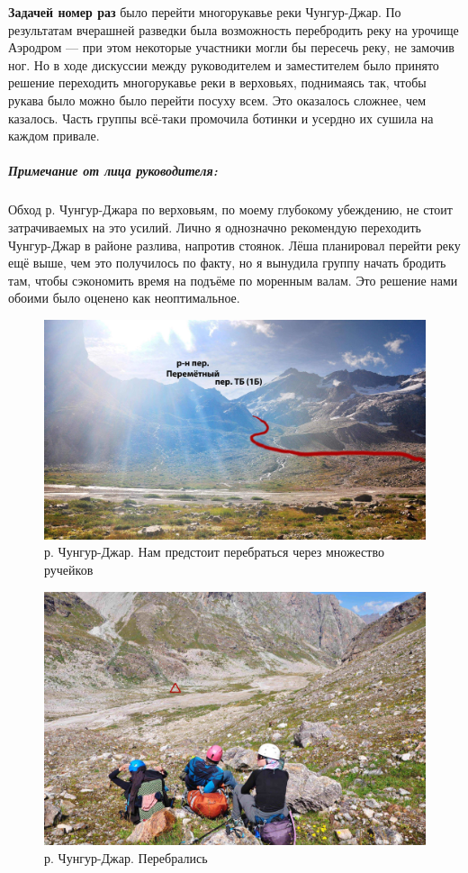 \textbf{Задачей номер раз} было перейти многорукавье реки Чунгур-Джар. По результатам вчерашней разведки была возможность перебродить реку на урочище Аэродром --- при этом некоторые участники могли бы пересечь реку, не замочив ног. Но в ходе дискуссии между руководителем и заместителем было принято решение переходить многорукавье реки в верховьях, поднимаясь так, чтобы рукава было можно было перейти посуху всем. Это оказалось сложнее, чем казалось. Часть группы всё-таки промочила ботинки и усердно их сушила на каждом привале. 

\subparagraph{Примечание от лица руководителя:} Обход р. Чунгур-Джара по верховьям, по моему глубокому убеждению, не стоит затрачиваемых на это усилий. Лично я однозначно рекомендую переходить Чунгур-Джар в районе разлива, напротив стоянок. Лёша планировал перейти реку ещё выше, чем это получилось по факту, но я вынудила группу начать бродить там, чтобы сэкономить время на подъёме по моренным валам. Это решение нами обоими было оценено как неоптимальное. 
\begin{figure}[h!]
	\centering
	\includegraphics[width=0.7\linewidth]{../pics/DSC_0254.jpg}
	\caption{р. Чунгур-Джар. Нам предстоит перебраться через множество ручейков}
	\label{fig:DSC_0254}
\end{figure}

\begin{figure}[h!]
	\centering
	\includegraphics[width=0.7\linewidth]{../pics/DSC_0277.jpg}
	\caption{р. Чунгур-Джар. Перебрались}
	\label{fig:DSC_0277}
\end{figure}

